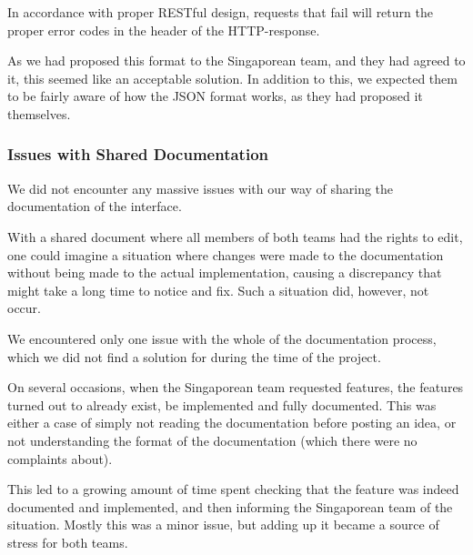 
In accordance with proper RESTful design, requests that fail will return the proper error codes\cite{restdev}
in the header of the HTTP-response.

As we had proposed this format to the Singaporean team, and they had agreed to it, this seemed like an
acceptable solution. In addition to this, we expected them to be fairly aware of how the JSON format works,
as they had proposed it themselves.

\subsubsection{Issues with Shared Documentation}

We did not encounter any massive issues with our way of sharing the documentation of the interface.

With a shared document where all members of both teams had the rights to edit, one could imagine a situation
where changes were made to the documentation without being made to the actual implementation, causing a
discrepancy that might take a long time to notice and fix. Such a situation did, however, not occur.

We encountered only one issue with the whole of the documentation process, which we did not find a solution for
during the time of the project.

On several occasions, when the Singaporean team requested features, the features turned out to already exist, be
implemented and fully documented. This was either a case of simply not reading the documentation before posting an
idea, or not understanding the format of the documentation (which there were no complaints about).

This led to a growing amount of time spent checking that the feature was indeed documented and implemented, and then
informing the Singaporean team of the situation. Mostly this was a minor issue, but adding up it became a source of
stress for both teams.
